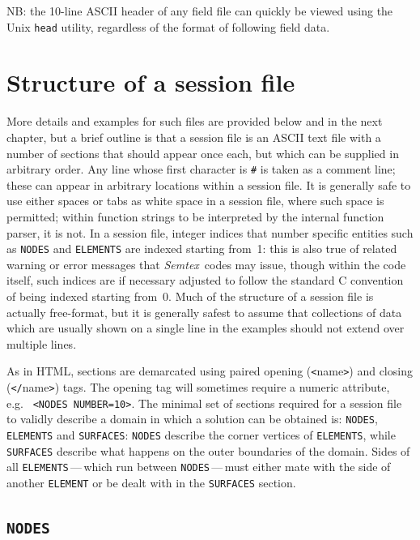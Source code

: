 \documentclass[11pt]{report}
\newcommand{\Semtex}{\emph{Semtex}} \newcommand{\Dog}{\emph{Dog}}
\newcommand{\eg}{e.g.\ } \newcommand{\CC}{\mathrm{c.c.}}
\begin{document}
NB: the 10-line ASCII header of any field file can quickly be viewed
using the Unix \verb|head| utility, regardless of the format of
following field data.

\section{Structure of a session file}
\label{sec.session}

More details and examples for such files are provided below and in the
next chapter, but a brief outline is that a session file is an ASCII
text file with a number of sections that should appear once each, but
which can be supplied in arbitrary order.  Any line whose first
character is \verb+#+ is taken as a comment line; these can appear in
arbitrary locations within a session file.  It is generally safe to
use either spaces or tabs as white space in a session file, where such
space is permitted; within function strings to be interpreted by the
internal function parser, it is not.  In a session file, integer
indices that number specific entities such as \verb|NODES| and
\verb|ELEMENTS| are indexed starting from~1: this is also true of
related warning or error messages that \Semtex\ codes may issue,
though within the code itself, such indices are if necessary adjusted
to follow the standard C convention of being indexed starting from~0.
Much of the structure of a session file is actually free-format, but
it is generally safest to assume that collections of data which are
usually shown on a single line in the examples should not extend over
multiple lines.

As in HTML, sections are demarcated using paired opening
(\verb+<+name\verb+>+) and closing (\verb+</+name\verb+>+) tags.  The
opening tag will sometimes require a numeric attribute, \eg
\verb+<NODES NUMBER=10>+.  The minimal set of sections required for a
session file to validly describe a domain in which a solution can be
obtained is: \verb+NODES+, \verb+ELEMENTS+ and \verb+SURFACES+:
\verb+NODES+ describe the corner vertices of \verb+ELEMENTS+, while
\verb+SURFACES+ describe what happens on the outer boundaries of the
domain. Sides of all \verb+ELEMENTS+\,---\,which run between
\verb+NODES+\,---\,must either mate with the side of another
\verb+ELEMENT+ or be dealt with in the \verb+SURFACES+ section.

\subsection{\texttt{NODES}}
\label{sec.nodes}
\end{document}
